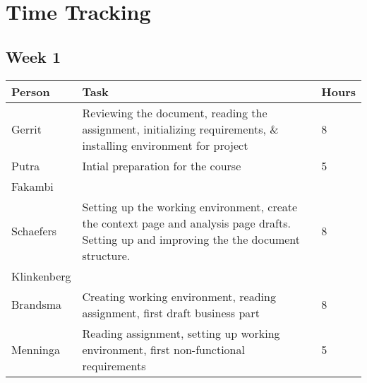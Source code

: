 \chapter{Time Tracking}
\label{App: Time Tracking}


\section{Week 1}
\begin{tabular}{p{} p{} p{}}
    \textbf{Person} & \textbf{Task} & \textbf{Hours} \\ \hline
	Gerrit & Reviewing the document, reading the assignment, initializing requirements, \& installing environment for project & 8 \\ \hline
	Putra & Intial preparation for the course & 5 \\ \hline
	Fakambi & & \\ \hline
	Schaefers & Setting up the working environment, create the context page and analysis page drafts. Setting up and improving the the document structure. & 8\\ \hline
	Klinkenberg & & \\ \hline
	Brandsma & Creating working environment, reading assignment, first draft business part & 8\\ \hline
	Menninga & Reading assignment, setting up working environment, first non-functional requirements & 5 \\ \hline
\end{tabular}

